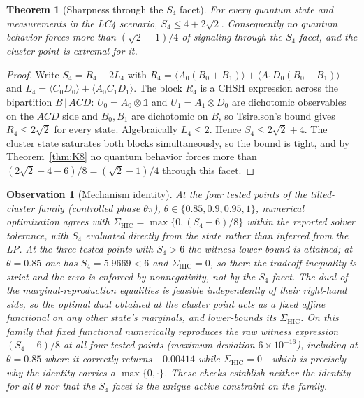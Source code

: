 \documentclass[10pt,twocolumn]{article}
\newtheorem{theorem}{Theorem}
\newtheorem{observation}{Observation}
\newcommand{\Sig}{\Sigma_{\mathrm{HIC}}}
\begin{document}
\begin{theorem}[Sharpness through the $S_4$ facet]
\label{thm:sharp}
For every quantum state and measurements in the LC4 scenario, $S_4 \le 4+2\sqrt2$. Consequently no quantum behavior forces more than $(\sqrt2-1)/4$ of signaling through the $S_4$ facet, and the cluster point is extremal for it.
\end{theorem}

\begin{proof}
Write $S_4 = R_4 + 2L_4$ with $R_4 = \langle A_0(B_0{+}B_1)\rangle + \langle A_1D_0(B_0{-}B_1)\rangle$ and $L_4 = \langle C_0D_0\rangle + \langle A_0C_1D_1\rangle$. The block $R_4$ is a CHSH expression across the bipartition $B\,|\,ACD$: $U_0 = A_0\otimes\mathbb 1$ and $U_1 = A_1\otimes D_0$ are dichotomic observables on the $ACD$ side and $B_0,B_1$ are dichotomic on $B$, so Tsirelson's bound gives $R_4 \le 2\sqrt2$ for every state. Algebraically $L_4\le2$. Hence $S_4 \le 2\sqrt2+4$. The cluster state saturates both blocks simultaneously, so the bound is tight, and by Theorem~\ref{thm:K8} no quantum behavior forces more than $(2\sqrt2+4-6)/8 = (\sqrt2-1)/4$ through this facet.
\end{proof}

\begin{observation}[Mechanism identity]
\label{obs:mech}
At the four tested points of the tilted-cluster family (controlled phase $\theta\pi$), $\theta \in \{0.85, 0.9, 0.95, 1\}$, numerical optimization agrees with $\Sig = \max\{0,(S_4-6)/8\}$ within the reported solver tolerance, with $S_4$ evaluated directly from the state rather than inferred from the LP. At the three tested points with $S_4>6$ the witness lower bound is attained; at $\theta=0.85$ one has $S_4 = 5.9669 < 6$ and $\Sig = 0$, so there the tradeoff inequality is strict and the zero is enforced by nonnegativity, not by the $S_4$ facet. The dual of the marginal-reproduction equalities is feasible independently of their right-hand side, so the optimal dual obtained \emph{at the cluster point} acts as a fixed affine functional on any other state's marginals, and lower-bounds its $\Sig$. On this family that fixed functional numerically reproduces the raw witness expression $(S_4-6)/8$ at all four tested points (maximum deviation $6\times10^{-16}$), \emph{including} at $\theta=0.85$ where it correctly returns $-0.00414$ while $\Sig=0$---which is precisely why the identity carries a $\max\{0,\cdot\}$. These checks establish neither the identity for all $\theta$ nor that the $S_4$ facet is the unique active constraint on the family.
\end{observation}
\end{document}
